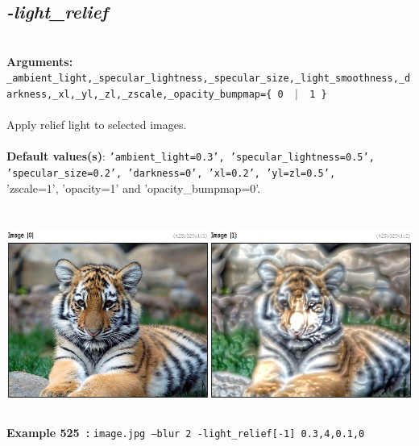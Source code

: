 \documentclass[a4paper,11pt,twoside]{book}
\begin{document}
\subsection{\emph{-light\_relief} }\vspace*{-0.5em}
~\\\textbf{Arguments: } 
{\small \texttt{\_ambient\_light,\_specular\_lightness,\_specular\_size,\_light\_smoothness,\_darkness,\_xl,\_yl,\_zl,\_zscale,\_opacity\_bumpmap=\{ 0 ~$|$~ 1 \}}}\\~\\
Apply relief light to selected images.
~\\~\\\textbf{Default values(s)}: {\small \texttt{'ambient\_light=0.3', 'specular\_lightness=0.5', 'specular\_size=0.2', 'darkness=0', 'xl=0.2', 'yl=zl=0.5',}}
~\\'zscale=1', 'opacity=1' and 'opacity\_bumpmap=0'.
\begin{center}\includegraphics[keepaspectratio=true,height=7cm,width=\textwidth]{img/gmic_def525.jpg}\\
{\footnotesize \textbf{Example 525~:} \texttt{image.jpg --blur 2 -light\_relief[-1] 0.3,4,0.1,0}}
\end{center}
\end{document}
